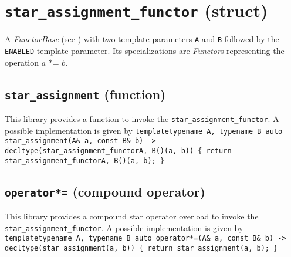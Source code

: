 
\section{\texttt{star\_assignment\_functor} (struct)}
A \textit{FunctorBase} (see \cite{functors}) with two template parameters \texttt{A} and \texttt{B} followed by the \texttt{ENABLED} template parameter.
Its specializations are \textit{Functor}s representing the operation $\textit{a *= b}$.

\subsection{\texttt{star\_assignment} (function)}
This library provides a function to invoke the \texttt{star\_assignment\_functor}.
A possible implementation is given by\newline
\texttt{template\textlangle typename A, typename B\textrangle\newline
auto\newline
star\_assignment(A\& a, const B\& b)\newline
-> decltype(star\_assignment\_functor\textlangle A, B\textrangle()(a, b))\newline
\{ return star\_assignment\_functor\textlangle A, B\textrangle()(a, b); \}}

\subsection{\texttt{operator*=} (compound operator)}
This library provides a compound star operator overload to invoke the \texttt{star\_assignment\_functor}.
A possible implementation is given by\newline
\texttt{template\textlangle typename A, typename B\textrangle\newline
auto\newline
operator*=(A\& a, const B\& b)\newline
-> decltype(star\_assignment(a, b))\newline
\{ return star\_assignment(a, b); \}}
